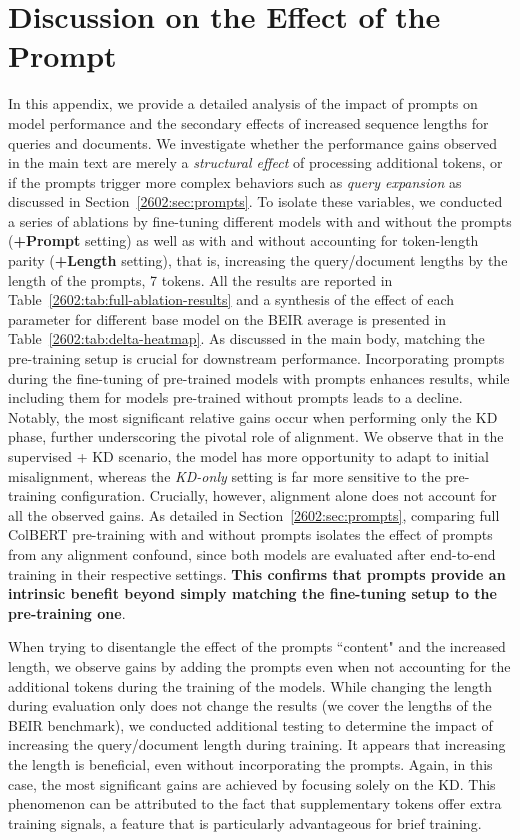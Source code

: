 \section{Discussion on the Effect of the Prompt}

\label{2602:appendix:prompts}
In this appendix, we provide a detailed analysis of the impact of prompts on model performance and the secondary effects of increased sequence lengths for queries and documents. We investigate whether the performance gains observed in the main text are merely a \emph{structural effect} of processing additional tokens, or if the prompts trigger more complex behaviors such as \emph{query expansion} as discussed in Section~\ref{2602:sec:prompts}. To isolate these variables, we conducted a series of ablations by fine-tuning different models with and without the prompts (\textbf{+Prompt} setting) as well as with and without accounting for token-length parity (\textbf{+Length} setting), that is, increasing the query/document lengths by the length of the prompts, 7 tokens. All the results are reported in Table~\ref{2602:tab:full-ablation-results} and a synthesis of the effect of each parameter for different base model on the BEIR average is presented in Table~\ref{2602:tab:delta-heatmap}.
As discussed in the main body, matching the pre-training setup is crucial for downstream performance. Incorporating prompts during the fine-tuning of pre-trained models with prompts enhances results, while including them for models pre-trained without prompts leads to a decline. Notably, the most significant relative gains occur when performing only the KD phase, further underscoring the pivotal role of alignment. We observe that in the supervised + KD scenario, the model has more opportunity to adapt to initial misalignment, whereas the \emph{KD-only} setting is far more sensitive to the pre-training configuration. Crucially, however, alignment alone does not account for all the observed gains. As detailed in Section~\ref{2602:sec:prompts}, comparing full ColBERT pre-training with and without prompts isolates the effect of prompts from any alignment confound, since both models are evaluated after end-to-end training in their respective settings. \textbf{This confirms that prompts provide an intrinsic benefit beyond simply matching the fine-tuning setup to the pre-training one}. 

When trying to disentangle the effect of the prompts ``content" and the increased length, we observe gains by adding the prompts even when not accounting for the additional tokens during the training of the models. While changing the length during evaluation only does not change the results (we cover the lengths of the BEIR benchmark), we conducted additional testing to determine the impact of increasing the query/document length during training. It appears that increasing the length is beneficial, even without incorporating the prompts. Again, in this case, the most significant gains are achieved by focusing solely on the KD. This phenomenon can be attributed to the fact that supplementary tokens offer extra training signals, a feature that is particularly advantageous for brief training. 

